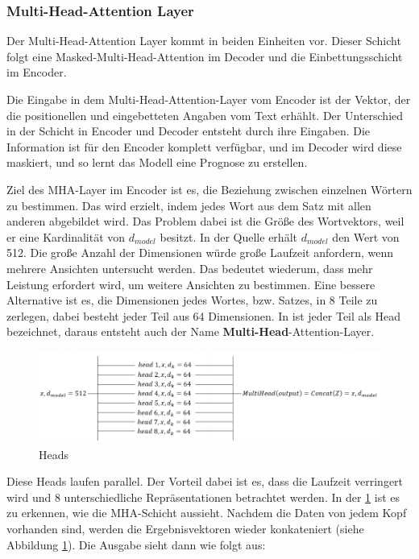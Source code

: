 \subsubsection{Multi-Head-Attention Layer} \label{MHA_Layer}
Der Multi-Head-Attention Layer kommt in beiden Einheiten vor. Dieser Schicht folgt eine Masked-Multi-Head-Attention im Decoder und die Einbettungsschicht im Encoder.

Die Eingabe in dem Multi-Head-Attention-Layer vom Encoder ist der Vektor, der die positionellen und eingebetteten Angaben vom Text erhählt. Der Unterschied in der Schicht in Encoder und Decoder entsteht durch ihre Eingaben. Die Information ist für den Encoder komplett verfügbar, und im Decoder wird diese maskiert, und so lernt das Modell eine Prognose zu erstellen.

Ziel des MHA-Layer im Encoder ist es, die Beziehung zwischen einzelnen Wörtern zu bestimmen. Das wird erzielt, indem jedes Wort aus dem Satz mit allen anderen abgebildet wird. Das Problem dabei ist die Größe des Wortvektors, weil er eine Kardinalität von $d_{model}$ besitzt. In der Quelle \cite{denis_Transformer:02} erhält $d_{model}$ den Wert von 512. Die große Anzahl der Dimensionen würde große Laufzeit anfordern, wenn mehrere Ansichten untersucht werden. Das bedeutet wiederum, dass mehr Leistung erfordert wird, um weitere Ansichten zu bestimmen. Eine bessere Alternative ist es, die Dimensionen jedes Wortes, bzw. Satzes, in 8 Teile zu zerlegen, dabei besteht jeder Teil aus 64 Dimensionen. In \cite{denis_Transformer:02} ist jeder Teil als Head bezeichnet, daraus entsteht auch der Name \textbf{Multi-Head}-Attention-Layer.

\begin{figure}[H]
	\centering
	\includegraphics[scale=0.45]{images/multi_head.png}
	\caption{Heads \cite{denis_Transformer:02}}
	\label{multi_head}
\end{figure}

Diese Heads laufen parallel. Der Vorteil dabei ist es, dass die Laufzeit verringert wird und 8 unterschiedliche Repräsentationen betrachtet werden. In der \cref{multi_head} ist es zu erkennen, wie die MHA-Schicht aussieht. Nachdem die Daten von jedem Kopf vorhanden sind, werden die Ergebnisvektoren wieder konkateniert (siehe Abbildung \ref{multi_head}). Die Ausgabe sieht dann wie folgt aus:

